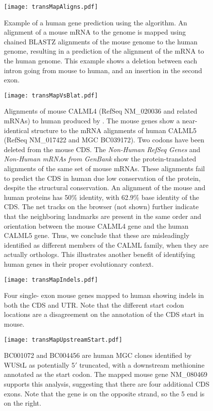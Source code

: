 \begin{figure}
\centering
\texttt{[image: transMapAligns.pdf]}
\caption{Example of a human gene prediction using the \TransMap
algorithm. An alignment of a mouse mRNA to the genome is mapped
using chained BLASTZ alignments of the mouse genome to the human
genome, resulting in a prediction of the alignment of the mRNA to
the human genome. This example shows a deletion between each intron
going from mouse to human, and an insertion in the second exon.}
\label{fig:transMapAlgo}
\end{figure}

\begin{figure}
\centering
\texttt{[image: transMapVsBlat.pdf]}
\caption{Alignments of mouse CALML4 (RefSeq NM\_020036 and related
mRNAs) to human produced by \TransMap. The mouse genes show a
near-identical structure to the mRNA \BLAT \cite{KENT02} alignments
of human CALML5 (RefSeq NM\_017422 and MGC BC039172).  Two codons
have been deleted from the mouse CDS. The {\em Non-Human RefSeq
Genes} and {\em Non-Human mRNAs from GenBank} show the
protein-translated \BLAT alignments of the same set of mouse mRNAs.
These alignments fail to predict the CDS in human due low
conservation of the protein, despite the structural conservation. An
alignment of the mouse and human proteins has 50\% identity, with
62.9\% base identity of the CDS.  The net tracks on the browser (not shown)
further indicate that the neighboring landmarks are present in the same
order and orientation between the mouse CALML4 gene and the human
CALML5 gene. Thus, we conclude that these are misleadingly identified
as different members of the CALML family, when they are actually
orthologs. This illustrates another benefit of identifying human
genes in their proper evolutionary context.}
\label{fig:transMapVsBlat}
\end{figure}

\begin{figure}
\centering
\texttt{[image: transMapIndels.pdf]}
\caption{Four single- exon mouse genes mapped to human showing
indels in both the CDS and UTR.  Note that the different start codon
locations are a disagreement on the annotation of the CDS start in
mouse.} \label{fig:transMapIndels}
\end{figure}

\begin{figure}
\centering
\texttt{[image: transMapUpstreamStart.pdf]}
\caption{BC001072 and BC004456 are human MGC clones identified by
WUStL as potentially 5$'$ truncated, with a downstream methionine
annotated as the start codon. The mapped mouse gene NM\_080469
supports this analysis, suggesting that there are four additional
CDS exons. Note that the gene is on the opposite strand, so the 5
end is on the right.} \label{fig:transMapUpstreamStart}
\end{figure}


